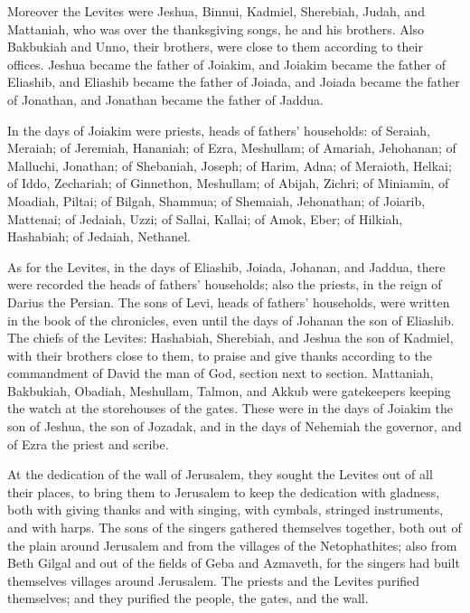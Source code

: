  Moreover the Levites were Jeshua, Binnui, Kadmiel,
Sherebiah, Judah, and Mattaniah, who was over the thanksgiving songs, he
and his brothers.  Also Bakbukiah and Unno, their
brothers, were close to them according to their offices. 
Jeshua became the father of Joiakim, and Joiakim became the father of
Eliashib, and Eliashib became the father of Joiada,  and
Joiada became the father of Jonathan, and Jonathan became the father of
Jaddua.

 In the days of Joiakim were priests, heads of fathers'
households: of Seraiah, Meraiah; of Jeremiah, Hananiah; 
of Ezra, Meshullam; of Amariah, Jehohanan;  of Malluchi,
Jonathan; of Shebaniah, Joseph;  of Harim, Adna; of
Meraioth, Helkai;  of Iddo, Zechariah; of Ginnethon,
Meshullam;  of Abijah, Zichri; of Miniamin, of Moadiah,
Piltai;  of Bilgah, Shammua; of Shemaiah, Jehonathan;
 of Joiarib, Mattenai; of Jedaiah, Uzzi; 
of Sallai, Kallai; of Amok, Eber;  of Hilkiah, Hashabiah;
of Jedaiah, Nethanel.

 As for the Levites, in the days of Eliashib, Joiada,
Johanan, and Jaddua, there were recorded the heads of fathers'
households; also the priests, in the reign of Darius the Persian.
 The sons of Levi, heads of fathers' households, were
written in the book of the chronicles, even until the days of Johanan
the son of Eliashib.  The chiefs of the Levites:
Hashabiah, Sherebiah, and Jeshua the son of Kadmiel, with their brothers
close to them, to praise and give thanks according to the commandment of
David the man of God, section next to section. 
Mattaniah, Bakbukiah, Obadiah, Meshullam, Talmon, and Akkub were
gatekeepers keeping the watch at the storehouses of the gates.
 These were in the days of Joiakim the son of Jeshua, the
son of Jozadak, and in the days of Nehemiah the governor, and of Ezra
the priest and scribe.

 At the dedication of the wall of Jerusalem, they sought
the Levites out of all their places, to bring them to Jerusalem to keep
the dedication with gladness, both with giving thanks and with singing,
with cymbals, stringed instruments, and with harps.  The
sons of the singers gathered themselves together, both out of the plain
around Jerusalem and from the villages of the Netophathites;
 also from Beth Gilgal and out of the fields of Geba and
Azmaveth, for the singers had built themselves villages around
Jerusalem.  The priests and the Levites purified
themselves; and they purified the people, the gates, and the wall.

